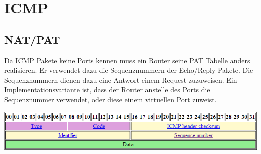 \section{ICMP}
\subsection{NAT/PAT}
Da ICMP Pakete keine Ports kennen muss ein Router seine PAT Tabelle anders realisieren.
Er verwendet dazu die Sequenznummern der Echo/Reply Pakete. Die Sequenznummern dienen dazu eine Antwort einem Request zuzuweisen. Ein Implementationsvariante ist, dass der Router anstelle des Ports die Sequenznummer verwendet, oder diese einem virtuellen Port zuweist.

\includegraphics[scale=0.8]{media/ICMPRequest.png}

